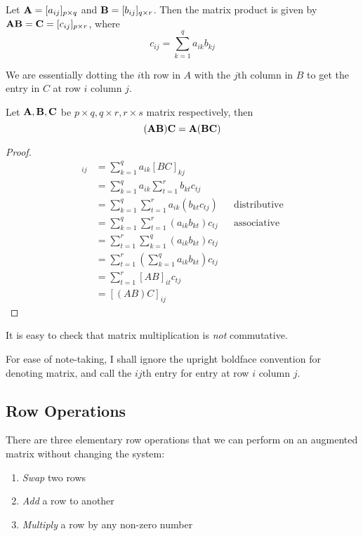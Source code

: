 \documentclass[11pt]{article}
\begin{document}
\begin{definition}
  Let \(\bf{A} = [a_{ij}]_{p\times q}\) and \(\bf{B} = [b_{ij}]_{q\times r}\). Then the matrix product is given by \(\bf{A}\bf{B}=\bf{C}=[c_{ij}]_{p\times r}\), where
  \begin{equation*}
    c_{ij} = \sum_{k=1}^{q} a_{ik}b_{kj}
  \end{equation*}
\end{definition}
We are essentially dotting the \(i\)th row in \(A\) with the \(j\)th column in \(B\) to get the entry in \(C\) at row \(i\) column \(j\).

\begin{theorem}
  Let \(\bf{A}, \bf{B}, \bf{C}\) be \(p\times q, q\times r, r \times s\) matrix respectively, then
  \begin{equation*}
    (\bf{A}\bf{B})\bf{C} = \bf{A}(\bf{B}\bf{C})
  \end{equation*}
\end{theorem}
\begin{proof}
  \begin{align*}
    [A(BC)]_{ij} &= \sum_{k=1}^q a_{ik}[BC]_{kj} \\
    &= \sum_{k=1}^{q} a_{ik} \sum_{t=1}^r b_{kt}c_{tj} \\
    &= \sum_{k=1}^q \sum_{t=1}^r a_{ik}(b_{kt}c_{tj}) &&\text{distributive} \\
    &= \sum_{k=1}^q \sum_{t=1}^r (a_{ik}b_{kt})c_{tj} &&\text{associative} \\
    &= \sum_{t=1}^r \sum_{k=1}^q (a_{ik}b_{kt})c_{tj} \\
    &= \sum_{t=1}^r (\sum_{k=1}^q a_{ik}b_{kt}) c_{tj} \\
    &= \sum_{t=1}^r [AB]_{it}c_{tj} \\
    &= [(AB)C]_{ij}
  \end{align*}
\end{proof}
It is easy to check that matrix multiplication is \emph{not} commutative. 

For ease of note-taking, I shall ignore the upright boldface convention for denoting matrix, and call the \(ij\)th entry for entry at row \(i\) column \(j\).

\subsection{Row Operations}
\begin{definition}
  There are three elementary row operations that we can perform on an augmented matrix without changing the system:
  \begin{enumerate}
    \item \emph{Swap} two rows
    \item \emph{Add} a row to another
    \item \emph{Multiply} a row by any non-zero number
  \end{enumerate}
\end{definition}
\end{document}

